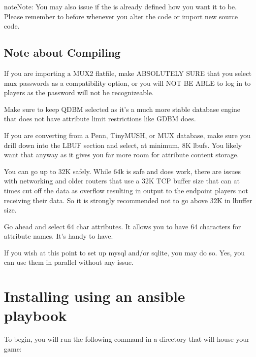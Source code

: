 \documentclass[letterpaper,10pt,english]{sphinxmanual}
\begin{document}
\begin{sphinxadmonition}{note}{Note:}
\sphinxAtStartPar
You may also issue  if the  is already defined how
you want it to be.  Please remember to  before 
whenever you alter the code or import new source code.
\end{sphinxadmonition}


\subsection{Note about Compiling}
\label{\detokenize{install:note-about-compiling}}
\sphinxAtStartPar
If you are importing a MUX2 flatfile, make ABSOLUTELY SURE that you select
mux passwords as a compatibility option, or you will NOT BE ABLE to log in
to players as the password will not be recognizeable.

\sphinxAtStartPar
Make sure to keep QDBM selected as it’s a much more stable database engine
that does not have attribute limit restrictions like GDBM does.

\sphinxAtStartPar
If you are converting from a Penn, TinyMUSH, or MUX database, make sure you
drill down into the LBUF section and select, at minimum, 8K lbufs.  You likely
want that anyway as it gives you far more room for attribute content storage.

\sphinxAtStartPar
You can go up to 32K safely.  While 64k is safe and does work, there are issues
with networking and older routers that use a 32K TCP buffer size that can
at times cut off the data as overflow resulting in output to the end\sphinxhyphen{}point
players not receiving their data.  So it is strongly recommended not to go
above 32K in lbuffer size.

\sphinxAtStartPar
Go ahead and select 64 char attributes.  It allows you to have 64 characters
for attribute names.  It’s handy to have.

\sphinxAtStartPar
If you wish at this point to set up mysql and/or sqlite, you  may do so.
Yes, you can use them in parallel without any issue.


\section{Installing using an ansible playbook}
\label{\detokenize{install:installing-using-an-ansible-playbook}}\label{\detokenize{install:ansible-install}}
\sphinxAtStartPar
To begin, you will run the following command in a directory that will house your game:
\end{document}
